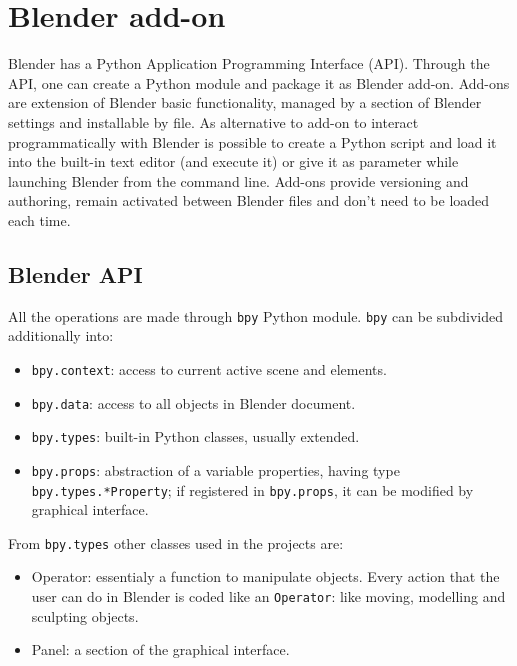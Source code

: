 \chapter{Blender add-on}
\label{chap:blender_add_on}

Blender has a Python Application Programming Interface (API). Through the API, one can create a Python module and package it as Blender add-on. Add-ons are extension of Blender basic functionality, managed by a section of Blender settings and installable by file.
As alternative to add-on to interact programmatically with Blender is possible to create a Python script and load it into the built-in text editor (and execute it) or give it as parameter while launching Blender from the command line.
Add-ons provide versioning and authoring, remain activated between Blender files and don't need to be loaded each time.

\section{Blender API}
All the operations are made through \texttt{bpy} Python module.
\texttt{bpy} can be subdivided additionally into:
\begin{itemize}
\item \texttt{bpy.context}: access to current active scene and elements.
\item \texttt{bpy.data}: access to all objects in Blender document.
\item \texttt{bpy.types}: built-in Python classes, usually extended. %
\item \texttt{bpy.props}: abstraction of a variable properties, having type \texttt{bpy.types.*Property}; if registered in \texttt{bpy.props}, it can be modified by graphical interface.
\end{itemize}
From \texttt{bpy.types} other classes used in the projects are:
\begin{itemize}
\item Operator: essentialy a function to manipulate objects. Every action that the user can do in Blender is coded like an \texttt{Operator}: like moving, modelling and sculpting objects.
\item Panel: a section of the graphical interface.

\end{itemize}

